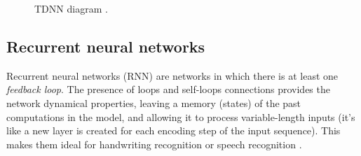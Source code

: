 \begin{center}
	\begin{figure}[ht!]
		\caption{TDNN diagram \cite{WikipediaTDNN}.}
	\end{figure}
\end{center}

\subsection{Recurrent neural networks}
Recurrent neural networks (RNN) are networks in which there is at least one \textit{feedback loop}. The presence of loops and self-loops connections provides the network dynamical properties, leaving a memory (states) of the past computations in the model, and allowing it to process variable-length inputs \cite{Yan09} (it's like a new layer is created for each encoding step of the input sequence). This makes them ideal for handwriting recognition or speech recognition \cite{Gra09, Li15}.
\bigbreak


